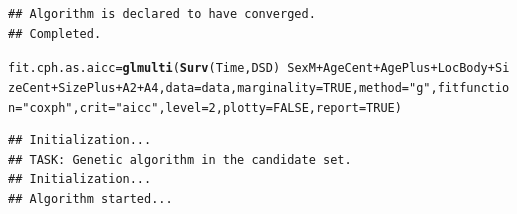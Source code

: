 \documentclass{article}\usepackage[]{graphicx}\usepackage[]{color}
\makeatletter
\newcommand{\hlnum}[1]{\textcolor[rgb]{0.686,0.059,0.569}{#1}}%
\newcommand{\hlstr}[1]{\textcolor[rgb]{0.192,0.494,0.8}{#1}}%
\newcommand{\hlopt}[1]{\textcolor[rgb]{0,0,0}{#1}}%
\newcommand{\hlstd}[1]{\textcolor[rgb]{0.345,0.345,0.345}{#1}}%
\newcommand{\hlkwb}[1]{\textcolor[rgb]{0.69,0.353,0.396}{#1}}%
\newcommand{\hlkwc}[1]{\textcolor[rgb]{0.333,0.667,0.333}{#1}}%
\newcommand{\hlkwd}[1]{\textcolor[rgb]{0.737,0.353,0.396}{\textbf{#1}}}%
\newenvironment{kframe}{%
 \def\at@end@of@kframe{}%
 \ifinner\ifhmode%
  \def\at@end@of@kframe{\end{minipage}}%
  \begin{minipage}{\columnwidth}%
 \fi\fi%
 \def\FrameCommand##1{\hskip\@totalleftmargin \hskip-\fboxsep
 \colorbox{shadecolor}{##1}\hskip-\fboxsep
     \hskip-\linewidth \hskip-\@totalleftmargin \hskip\columnwidth}%
 \MakeFramed {\advance\hsize-\width
   \@totalleftmargin\z@ \linewidth\hsize
   \@setminipage}}%
 {\par\unskip\endMakeFramed%
 \at@end@of@kframe}
\newenvironment{knitrout}{}{} %
\makeatother
\begin{document}
\begin{knitrout}
\begin{kframe}
\begin{verbatim}
## Algorithm is declared to have converged.
## Completed.
\end{verbatim}
\begin{alltt}
\hlstd{fit.cph.as.aicc} \hlkwb{=} \hlkwd{glmulti}\hlstd{(}\hlkwd{Surv}\hlstd{(Time, DSD)} \hlopt{~} \hlstd{SexM} \hlopt{+} \hlstd{AgeCent} \hlopt{+} \hlstd{AgePlus} \hlopt{+} \hlstd{LocBody} \hlopt{+} \hlstd{SizeCent} \hlopt{+} \hlstd{SizePlus} \hlopt{+} \hlstd{A2} \hlopt{+} \hlstd{A4,} \hlkwc{data} \hlstd{= data,} \hlkwc{marginality} \hlstd{=} \hlnum{TRUE}\hlstd{,} \hlkwc{method} \hlstd{=} \hlstr{"g"}\hlstd{,} \hlkwc{fitfunction} \hlstd{=} \hlstr{"coxph"}\hlstd{,} \hlkwc{crit} \hlstd{=} \hlstr{"aicc"}\hlstd{,} \hlkwc{level} \hlstd{=} \hlnum{2}\hlstd{,} \hlkwc{plotty} \hlstd{=} \hlnum{FALSE}\hlstd{,} \hlkwc{report} \hlstd{=} \hlnum{TRUE}\hlstd{)}
\end{alltt}
\begin{verbatim}
## Initialization...
## TASK: Genetic algorithm in the candidate set.
## Initialization...
## Algorithm started...
\end{verbatim}



\end{kframe}
\end{knitrout}
\end{document}
